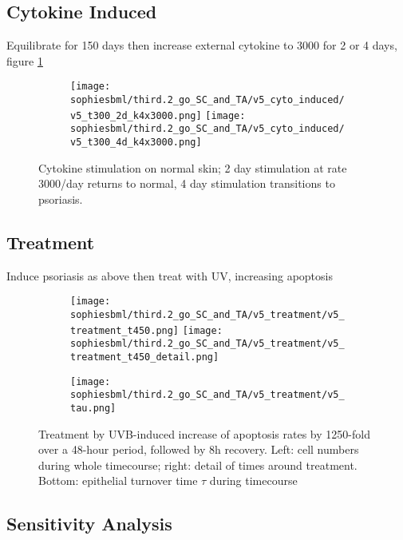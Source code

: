 \documentclass[a4paper,10pt]{report}
\newcommand{\psortbase}{/home/ngrs2/work/bsu/PSORT_Zuliani_Reynolds/}
\newcommand{\sbmlbase}{\psortbase/sbml-sh/}
\newcommand{\sophiesbml}{\sbmlbase/sophie_like}
\begin{document}
\subsection{Cytokine Induced}

Equilibrate for 150 days then increase external cytokine to 3000 for 2 or 4 days, figure \ref{fig:thirdpointtwosophie_cytostim}


\begin{figure}[h!]
  \begin{subfigure}{\textwidth}
    \texttt{[image: \\sophiesbml/third.2\_go\_SC\_and\_TA/v5\_cyto\_induced/v5\_t300\_2d\_k4x3000.png]}
    \texttt{[image: \\sophiesbml/third.2\_go\_SC\_and\_TA/v5\_cyto\_induced/v5\_t300\_4d\_k4x3000.png]}
  \end{subfigure}
  \caption{Cytokine stimulation on normal skin; 2 day stimulation at rate 3000/day returns to normal, 4 day stimulation transitions to psoriasis.}
  \label{fig:thirdpointtwosophie_cytostim}
\end{figure}




\subsection{Treatment}

Induce psoriasis as above then treat with UV, increasing apoptosis

\begin{figure}[h!]
  \begin{subfigure}{\textwidth}
    \texttt{[image: \\sophiesbml/third.2\_go\_SC\_and\_TA/v5\_treatment/v5\_treatment\_t450.png]}
    \texttt{[image: \\sophiesbml/third.2\_go\_SC\_and\_TA/v5\_treatment/v5\_treatment\_t450\_detail.png]}
  \end{subfigure}
  \begin{subfigure}{\textwidth}
    \texttt{[image: \\sophiesbml/third.2\_go\_SC\_and\_TA/v5\_treatment/v5\_tau.png]}
  \end{subfigure}
  \caption{Treatment by UVB-induced increase of apoptosis rates by 1250-fold over a 48-hour period, followed by 8h recovery. Left: cell numbers during whole timecourse; right: detail of times around treatment. Bottom: epithelial turnover time $\tau$ during timecourse}
  \label{fig:thirdpointtwosophie_treatment}
\end{figure}


\subsection{Sensitivity Analysis}
\end{document}
